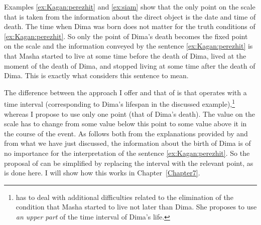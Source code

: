 Examples \ref{ex:Kagan:perezhit} and \ref{ex:siam} show that the only point on the scale that is taken from the information about the direct object is the date and time of death. The time when Dima was born does not matter for the truth conditions of \ref{ex:Kagan:perezhit}. So only the point of Dima's death becomes the fixed point on the scale and the information conveyed by the sentence \ref{ex:Kagan:perezhit} is that Masha started to live at some time before the death of Dima, lived at the moment of the death of Dima, and stopped living at some time after the death of Dima. This is exactly what \citet{Kagan:book} considers this sentence to mean. 

The difference between the approach I offer and that of \citet{Kagan:book} is that \citet{Kagan:book} operates with a time interval (corresponding to Dima's lifespan in the discussed example),\footnote{\citet[143--144]{Kagan:book} has to deal with additional difficulties related to the elimination of the condition that Masha started to live not later than Dima. She proposes to use \textit{an upper part} of the time interval of Dima's life.} whereas I propose to use only one point (that of Dima's death). The value on the scale has to change from some value below this point to some value above it in the course of the event. As follows both from the explanations provided by \citet{Kagan:book} and from what we have just discussed, the information about the birth of Dima is of no importance for the interpretation of the sentence \ref{ex:Kagan:perezhit}. So the proposal of \citet{Kagan:book} can be simplified by replacing the interval with the relevant point, as is done here. I will show how this works in Chapter~\ref{Chapter7}.

